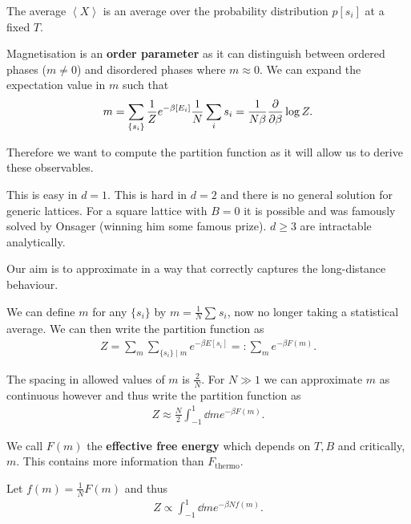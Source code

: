 \begin{note}
    The average $\left< X \right>$ is an average over the probability distribution $p\left[  s_{i}\right] $ at a fixed $T$.
\end{note}

Magnetisation is an \textbf{order parameter} as it can distinguish between ordered phases ($m \neq 0$) and disordered phases where $m \approx 0$. We can expand the expectation value in $m$ such that
\begin{align}
    m = \sum_{\{s_{i}\} }^{} \frac{1}{Z} e^{-\beta \left[ E_{i} \right] } \frac{1}{N} \sum_{i}^{} s_{i} = \frac{1}{N\beta} \pdv{\beta} \log Z
.\end{align}

Therefore we want to compute the partition function as it will allow us to derive these observables.

This is easy in $d = 1$. This is hard in $d = 2$ and there is no general solution for generic lattices. For a square lattice with $B=0$ it is possible and was famously solved by Onsager (winning him some famous prize). $d \geq 3$ are intractable analytically.

Our aim is to approximate in a way that correctly captures the long-distance behaviour.

We can define $m$ for any $\{s_{i}\} $ by $m = \frac{1}{N} \sum_{}^{} s_{i}$, now no longer taking a statistical average. We can then write the partition function as
\begin{align}
    Z = \sum_{m} \sum_{\{s_{i}\} \mid m}  e^{-\beta E \left[ s_{i} \right] } =: \sum_{m}^{} e^{-\beta F \left( m \right) }
.\end{align}

The spacing in allowed values of $m$ is $\frac{2}{N}$. For $N \gg 1$ we can approximate $m$ as continuous however and thus write the partition function as
\begin{align}
    Z \approx \frac{N}{2} \int_{-1}^{1} \dd{m} e^{-\beta F\left( m \right) }
.\end{align}

We call $F\left( m \right) $ the \textbf{effective free energy} which depends on $T,B$ and critically, $m$. This contains more information than $F_{\text{thermo}}$.

Let $f\left( m \right) = \frac{1}{N}F\left( m \right)$ and thus
\begin{align}
    Z \propto \int_{-1}^{1} \dd{m} e^{-\beta N f\left( m \right) }
.\end{align}

